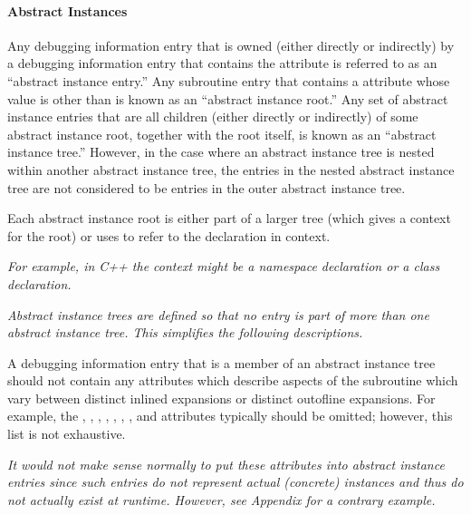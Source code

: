 \paragraph{Abstract Instances}
\label{chap:abstractinstances}
Any debugging information entry that is owned (either
directly or indirectly) by a debugging information entry
that contains the  attribute is referred to
as an ``abstract instance entry.'' Any subroutine entry
that contains a  attribute whose value is other
than  is known as 
an ``abstract instance root.'' 
Any set of abstract instance entries that are all
children (either directly or indirectly) of some abstract
instance root, together with the root itself, is known as
an ``abstract instance tree.'' However, in the case where
an abstract instance tree is nested within another abstract
instance tree, the entries in the nested abstract instance
tree are not considered to be entries in the outer abstract
instance tree.

Each abstract instance root is either part of a larger
tree (which gives a context for the root) or uses
 to refer to the declaration in context.

\textit{For example, in C++ the context might be a namespace
declaration or a class declaration.}

\textit{Abstract instance trees are defined so that no entry is part
of more than one abstract instance tree. This simplifies the
following descriptions.}

A debugging information entry that is a member of an abstract
instance tree should not contain any attributes which describe
aspects of the subroutine which vary between distinct inlined
expansions or distinct out\dash of\dash line expansions. For example,
the ,
, , 
, ,
, , and 
attributes typically should be omitted; however, this list
is not exhaustive.

\textit{It would not make sense normally to put these attributes into
abstract instance entries since such entries do not represent
actual (concrete) instances and thus do not actually exist at
run\dash time.  However, 
see Appendix  
for a contrary example.}

